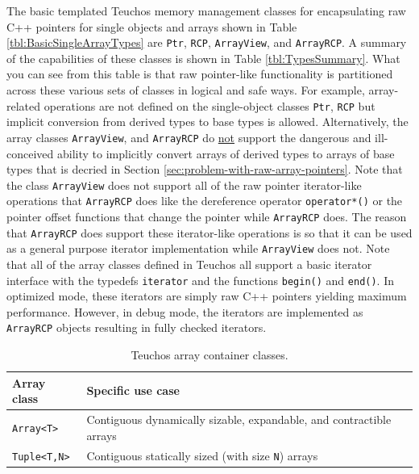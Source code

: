 \documentclass[pdf,ps2pdf,11pt]{SANDreport}
\begin{document}
The basic templated Teuchos memory management classes for encapsulating
raw C++ pointers for single objects and arrays shown in Table
{}\ref{tbl:BasicSingleArrayTypes} are {}\texttt{Ptr},
{}\texttt{RCP}, {}\texttt{ArrayView}, and {}\texttt{ArrayRCP}.  A
summary of the capabilities of these classes is shown in Table
{}\ref{tbl:TypesSummary}.  What you can see from this table is that
raw pointer-like functionality is partitioned across these various
sets of classes in logical and safe ways.  For example, array-related
operations are not defined on the single-object classes
{}\texttt{Ptr}, {}\texttt{RCP} but implicit conversion from derived
types to base types is allowed.  Alternatively, the array classes
{}\texttt{ArrayView}, and {}\texttt{ArrayRCP} do {}\underline{not}
support the dangerous and ill-conceived ability to implicitly convert
arrays of derived types to arrays of base types that is decried in
Section {}\ref{sec:problem-with-raw-array-pointers}.  Note that the
class {}\texttt{ArrayView} does not support all of the raw pointer
iterator-like operations that {}\texttt{ArrayRCP} does like the
dereference operator {}\texttt{operator*()} or the pointer offset
functions that change the pointer while {}\texttt{ArrayRCP} does.  The
reason that {}\texttt{ArrayRCP} does support these iterator-like
operations is so that it can be used as a general purpose iterator
implementation while {}\texttt{ArrayView} does not.  Note that all of
the array classes defined in Teuchos all support a basic iterator
interface with the typedefs {}\texttt{iterator} and the functions
{}\texttt{begin()} and {}\texttt{end()}.  In optimized mode, these
iterators are simply raw C++ pointers yielding maximum performance.
However, in debug mode, the iterators are implemented as
{}\texttt{ArrayRCP} objects resulting in fully checked iterators.

\begin{table}
\begin{center}
\begin{tabular}{|l|l|}
\hline
Array class
& Specific use case \\
\hline
{}\texttt{Array<T>}
&  Contiguous dynamically sizable, expandable, and contractible arrays \\
{}\texttt{Tuple<T,N>}
&  Contiguous statically sized (with size {}\texttt{N}) arrays \\
\hline
\end{tabular}
\end{center}
\caption{\label{tbl:ExtendedArrayTypes}
Teuchos array container classes.}
\end{table}
\end{document}
